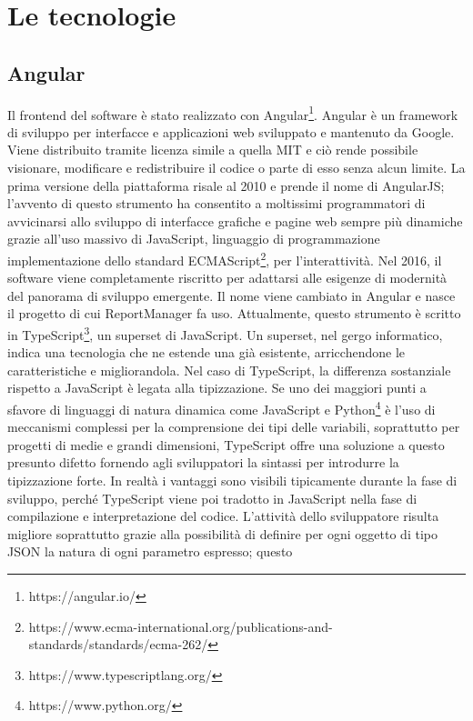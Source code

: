 \chapter{Le tecnologie}\label{c:technologies}

\section{Angular}

Il frontend del software è stato realizzato con Angular\footnote{https://angular.io/}.
Angular è un framework di sviluppo per interfacce e applicazioni web sviluppato e mantenuto da Google.
Viene distribuito tramite licenza simile a quella MIT e ciò rende possibile visionare, modificare e redistribuire il codice o parte di esso senza alcun limite.
La prima versione della piattaforma risale al 2010 e prende il nome di AngularJS; l'avvento di questo strumento ha consentito a moltissimi programmatori di avvicinarsi
allo sviluppo di interfacce grafiche e pagine web sempre più dinamiche grazie all'uso massivo di JavaScript, linguaggio di programmazione implementazione dello standard
ECMAScript\footnote{https://www.ecma-international.org/publications-and-standards/standards/ecma-262/}, per l'interattività.
Nel 2016, il software viene completamente riscritto per adattarsi alle esigenze di modernità del panorama di sviluppo emergente.
Il nome viene cambiato in Angular e nasce il progetto di cui ReportManager fa uso.
Attualmente, questo strumento è scritto in TypeScript\footnote{https://www.typescriptlang.org/}, un superset di JavaScript.
Un superset, nel gergo informatico, indica una tecnologia che ne estende una già esistente, arricchendone le caratteristiche e migliorandola.
Nel caso di TypeScript, la differenza sostanziale rispetto a JavaScript è legata alla tipizzazione.
Se uno dei maggiori punti a sfavore di linguaggi di natura dinamica come JavaScript e Python\footnote{https://www.python.org/} è l'uso di meccanismi complessi per la comprensione
dei tipi delle variabili, soprattutto per progetti di medie e grandi dimensioni, TypeScript offre una soluzione a questo presunto difetto fornendo agli sviluppatori la sintassi
per introdurre la tipizzazione forte.
In realtà i vantaggi sono visibili tipicamente durante la fase di sviluppo, perché TypeScript viene poi tradotto in JavaScript nella fase di compilazione e interpretazione del codice.
L'attività dello sviluppatore risulta migliore soprattutto grazie alla possibilità di definire per ogni oggetto di tipo JSON la natura di ogni parametro espresso; questo 
